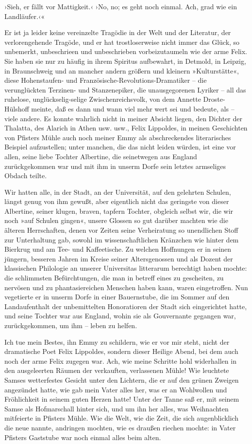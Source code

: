 ›Sieh, er fällt vor Mattigkeit.‹ ›No, no; es geht noch einmal. Ach,
grad wie ein Landläufer.‹«

Er ist ja leider keine vereinzelte Tragödie in der Welt und der
Literatur, der verlorengehende Tragöde, und er hat trostloserweise
nicht immer das Glück, so unbemerkt, unbeschrieen und unbeschrieben
vorbeizutaumeln wie der arme Felix. Sie haben sie nur zu häufig in
ihrem Spiritus aufbewahrt, in Detmold, in Leipzig, in Braunschweig
und an mancher andern größern und kleinern »Kulturstätte«, diese
Hohenstaufen- und Französische-Revolutions-Dramatiker – die
verunglückten Terzinen- und Stanzenepiker, die unausgegorenen
Lyriker – all das ruhelose, unglückselig-selige Zwischenreichsvolk,
von dem Annette Droste-Hülshoff meinte, daß es dann und wann viel
mehr wert sei und bedeute, als – viele andere. Es konnte wahrlich
nicht in meiner Absicht liegen, den Dichter der Thalatta, des
Alarich in Athen usw. usw., Felix Lippoldes, in meinen Geschichten
von Pfisters Mühle auch noch meiner Emmy als abschreckendes
literarisches Beispiel aufzustellen; unter manchen, die das nicht
leiden würden, ist eine vor allen, seine liebe Tochter Albertine,
die seinetwegen aus England zurückgekommen war und mit ihm in
unserm Dorfe sein letztes armseliges Obdach teilte.

Wir hatten alle, in der Stadt, an der Universität, auf den
gelehrten Schulen, längst genug von ihm gewußt, aber eigentlich
nicht das geringste von dieser Albertine, seiner klugen, braven,
tapfern Tochter, obgleich selbst wir, die wir noch »auf Schulen
gingen«, unsere Glossen so gut darüber machten wie die älteren
Herrschaften, denen vor Zeiten seine Verheiratung so unendlichen
Stoff zur Unterhaltung gab, sowohl im wissenschaftlichen Kränzchen
wie hinter dem Bierkrug und am Tee- und Kaffeetische. Zu welchen
Hoffnungen er in seinen jüngern, besseren Jahren im Kreise seiner
Altersgenossen und als Dozent der klassischen Philologie an unserer
Universitas litterarum berechtigt haben mochte: die schlimmsten
Befürchtungen, die man in betreff eines zu gescheiten, zu nervösen
und zu phantasiereichen Menschen haben kann, waren eingetroffen.
Nun vegetierte er in unserm Dorfe in einer Bauernstube, die im
Sommer auf den Landaufenthalt der unbemittelten Honoratioren der
Stadt sich eingerichtet hatte, und seine Tochter war aus England,
wohin sie als Gouvernante gegangen war, zurückgekommen, um ihm –
leben zu helfen.

Ich tue mein Bestes, ihn Emmy zu schildern, wie er vor mir steht,
nicht der dramatische Poet Felix Lippoldes, sondern dieser Heilige
Abend, bei dem auch noch der arme Felix zugegen war. Ach, wie meine
Schritte hohl widerhallen in den ausgeleerten Räumen der
verkauften, verlassenen Mühle! Wie leuchtete Samses wetterfestes
Gesicht unter den Lichtern, die er auf den grünen Zweigen
angezündet hatte, wie gab mein Vater alles her, was er an
Wohlwollen und Fröhlichkeit in seinem guten Herzen hatte! Unter der
Tanne saß er, mit seinem Samse als Hofmarschall hinter sich, und um
ihn her alles, was Weihnachten mitfeierte in Pfisters Mühle. Wie
die Welt, wie die Zeit, die sich augenblicklich die neue nannte,
andringen mochten, wie es draußen riechen mochte: in Vater Pfisters
Gaststube war noch einmal alles beim alten.

